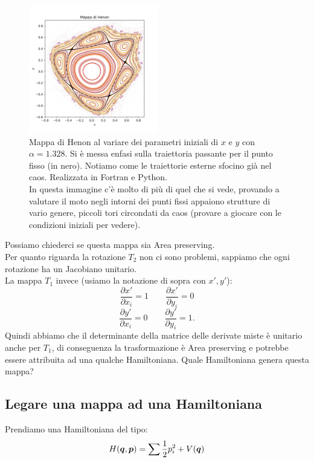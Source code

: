 \begin{figure}[H]
    \centering
    \includegraphics[width=0.5\textwidth]{figures/18_Henon_map.png}
    \caption{\scriptsize Mappa di Henon al variare dei parametri iniziali di $x$ e $y$ con $\alpha = 1.328$. Si è messa enfasi sulla traiettoria passante per il punto fisso (in nero). Notiamo come le traiettorie esterne sfocino già nel caos. Realizzata in Fortran e Python.\\
    In questa immagine c'è molto di più di quel che si vede, provando a valutare il moto negli intorni dei punti fissi appaiono strutture di vario genere, piccoli tori circondati da caos (provare a giocare con le condizioni iniziali per vedere).}
    \label{fig:figures-18_Henon_map-png}
\end{figure}
\noindent
Possiamo chiederci se questa mappa sia Area preserving. \\
Per quanto riguarda la rotazione $T_2$ non ci sono problemi, sappiamo che ogni rotazione ha un Jacobiano unitario. \\
La mappa $T_1$ invece (usiamo la notazione di sopra con $x', y'$):
\[
    \frac{\partial x'}{\partial x_i} = 1 \qquad \frac{\partial x'}{\partial y_{i}} = 0
\] 
\[
    \frac{\partial y'}{\partial x_i} = 0  \qquad  \frac{\partial y'}{\partial y_{i}} = 1
.\] 
Quindi abbiamo che il determinante della matrice delle derivate miste è unitario anche per $T_1$, di conseguenza la trasformazione è Area preserving e potrebbe essere attribuita ad una qualche Hamiltoniana. Quale Hamiltoniana genera questa mappa?
\subsection{Legare una mappa ad una Hamiltoniana}%
\label{sub:Legare una mappa ad una Hamiltoniana}
Prendiamo una Hamiltoniana del tipo:
\begin{equation}
    H(\boldsymbol{q}, \boldsymbol{p})=\sum_{}^{} \frac{1}{2}p_i^2 + V(\boldsymbol{q})
    \label{eq:19_H}
\end{equation}
